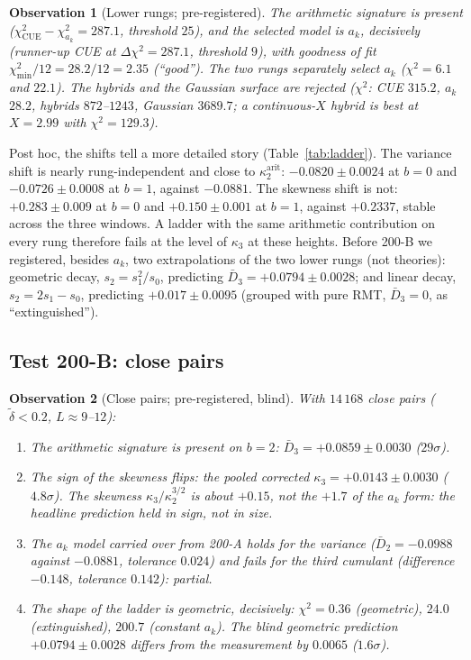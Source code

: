 \documentclass[12pt]{amsart}
\newtheorem{observation}{Observation}
\theoremstyle{remark}
\newcommand{\1}{\mathbf{1}}
\begin{document}
\begin{observation}[Lower rungs; pre-registered]\label{obs:A}
The arithmetic signature is present ($\chi^2_{\mathrm{CUE}}-\chi^2_{a_k}=287.1$,
threshold $25$), and the selected model is $a_k$, decisively (runner-up
CUE at $\Delta\chi^2=287.1$, threshold $9$), with goodness of fit
$\chi^2_{\min}/12=28.2/12=2.35$ (``good''). The two rungs separately select
$a_k$ ($\chi^2=6.1$ and $22.1$). The hybrids and the Gaussian surface are
rejected ($\chi^2$: CUE $315.2$, $a_k$ $28.2$, hybrids $872$--$1243$,
Gaussian $3689.7$; a continuous-$X$ hybrid is best at $X=2.99$ with
$\chi^2=129.3$).
\end{observation}

Post hoc, the shifts tell a more detailed story (Table~\ref{tab:ladder}).
The variance shift is nearly rung-independent and close to
$\kappa_2^{\mathrm{arit}}$: $-0.0820\pm0.0024$ at $b=0$ and
$-0.0726\pm0.0008$ at $b=1$, against $-0.0881$. The skewness shift is
not: $+0.283\pm0.009$ at $b=0$ and $+0.150\pm0.001$ at $b=1$, against
$+0.2337$, stable across the three windows. A ladder with the same
arithmetic contribution on every rung therefore fails at the level of
$\kappa_3$ at these heights. Before 200-B we registered, besides $a_k$,
two extrapolations of the two lower rungs (not theories): geometric
decay, $s_2=s_1^2/s_0$, predicting $\bar D_3=+0.0794\pm0.0028$; and linear
decay, $s_2=2s_1-s_0$, predicting $+0.017\pm0.0095$ (grouped with pure
RMT, $\bar D_3=0$, as ``extinguished'').

\subsection*{Test 200-B: close pairs}

\begin{observation}[Close pairs; pre-registered, blind]\label{obs:B}
With $14\,168$ close pairs ($\tilde\delta<0.2$, $L\approx9$--$12$):
\begin{enumerate}
\item[(1)] The arithmetic signature is present on $b=2$:
$\bar D_3=+0.0859\pm0.0030$ ($29\sigma$).
\item[(2)] The sign of the skewness flips: the pooled corrected
$\kappa_3=+0.0143\pm0.0030$ ($4.8\sigma$). The skewness
$\kappa_3/\kappa_2^{3/2}$ is about $+0.15$, not the $+1.7$ of the $a_k$
form: the headline prediction held in sign, not in size.
\item[(3)] The $a_k$ model carried over from 200-A holds for the variance
($\bar D_2=-0.0988$ against $-0.0881$, tolerance $0.024$) and fails for
the third cumulant (difference $-0.148$, tolerance $0.142$): partial.
\item[(4)] The shape of the ladder is geometric, decisively:
$\chi^2=0.36$ (geometric), $24.0$ (extinguished), $200.7$ (constant $a_k$).
The blind geometric prediction $+0.0794\pm0.0028$ differs from the
measurement by $0.0065$ ($1.6\sigma$).
\end{enumerate}
\end{observation}
\end{document}
